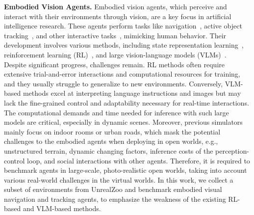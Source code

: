 \documentclass{article}
\begin{document}
\textbf{Embodied Vision Agents.}
Embodied vision agents, which perceive and interact with their environments through vision, are a key focus in artificial intelligence research. These agents perform tasks like navigation~\citep{thor2017, gupta2017cognitive, yokoyama2024vlfm, long2024instructnav}, active object tracking~\citep{luo2018end, zhong2018advat, zhong2021distractor, zhong2023rspt, zhong2024empowering}, and other interactive tasks~\citep{chaplot2020learning, weihs2021visual, ci2023proactive, wang2023rearrange}, mimicking human behavior. Their development involves various methods, including state representation learning~\citep{yadav2023offline, yuan2022pre, gadre2022continuous, yang2023track}, reinforcement learning (RL)~\citep{schulman2017proximal, xu2023drm, ma2023revisiting}, and large vision-language models (VLMs)~\citep{zhang2024navid, zhou2024navgpt}.
Despite significant progress, challenges remain. RL methods often require extensive trial-and-error interactions and computational resources for training, and they usually struggle to generalize to new environments. Conversely, VLM-based methods excel at interpreting language instructions and images but may lack the fine-grained control and adaptability necessary for real-time interactions. The computational demands and time needed for inference with such large models are critical, especially in dynamic scenes.
Moreover, previous simulators mainly focus on indoor rooms or urban roads, which mask the potential challenges to the embodied agents when deploying in open worlds, e.g., unstructured terrain, dynamic changing factors, inference costs of the perception-control loop, and social interactions with other agents. Therefore, it is required to benchmark agents in large-scale, photo-realistic open worlds, taking into account various real-world challenges in the virtual worlds. In this work, we collect a subset of environments from UnrealZoo and benchmark embodied visual navigation and tracking agents, to emphasize the weakness of the existing RL-based and VLM-based methods.

\vspace{-0.3cm}
\end{document}

